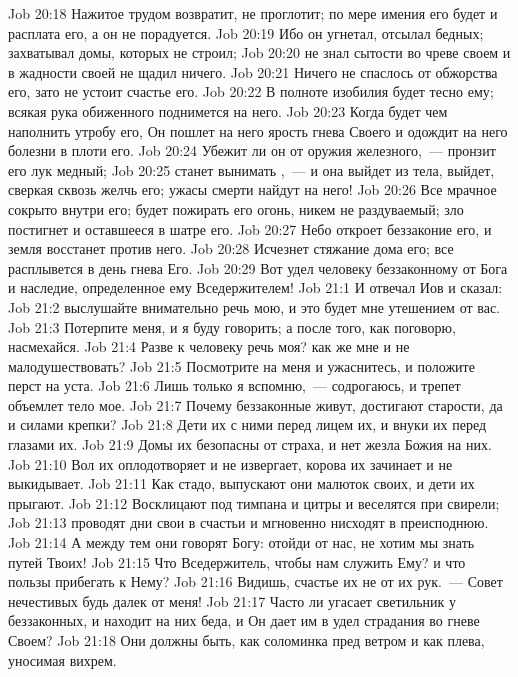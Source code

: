 \vs Job 20:18 Нажитое трудом возвратит, не проглотит; по мере имения его будет и расплата его, а он не порадуется.
\vs Job 20:19 Ибо он угнетал, отсылал бедных; захватывал домы, которых не строил;
\vs Job 20:20 не знал сытости во чреве своем и в жадности своей не щадил ничего.
\vs Job 20:21 Ничего не спаслось от обжорства его, зато не устоит счастье его.
\vs Job 20:22 В полноте изобилия будет тесно ему; всякая рука обиженного поднимется на него.
\vs Job 20:23 Когда будет чем наполнить утробу его, Он пошлет на него ярость гнева Своего и одождит на него болезни в плоти его.
\vs Job 20:24 Убежит ли он от оружия железного,~--- пронзит его лук медный;
\vs Job 20:25 станет вынимать ,~--- и она выйдет из тела, выйдет, сверкая сквозь желчь его; ужасы смерти найдут на него!
\vs Job 20:26 Все мрачное сокрыто внутри его; будет пожирать его огонь, никем не раздуваемый; зло постигнет и оставшееся в шатре его.
\vs Job 20:27 Небо откроет беззаконие его, и земля восстанет против него.
\vs Job 20:28 Исчезнет стяжание дома его; все расплывется в день гнева Его.
\vs Job 20:29 Вот удел человеку беззаконному от Бога и наследие, определенное ему Вседержителем!
\vs Job 21:1 И отвечал Иов и сказал:
\vs Job 21:2 выслушайте внимательно речь мою, и это будет мне утешением от вас.
\vs Job 21:3 Потерпите меня, и я буду говорить; а после того, как поговорю, насмехайся.
\vs Job 21:4 Разве к человеку речь моя? как же мне и не малодушествовать?
\vs Job 21:5 Посмотрите на меня и ужаснитесь, и положите перст на уста.
\vs Job 21:6 Лишь только я вспомню,~--- содрогаюсь, и трепет объемлет тело мое.
\vs Job 21:7 Почему беззаконные живут, достигают старости, да и силами крепки?
\vs Job 21:8 Дети их с ними перед лицем их, и внуки их перед глазами их.
\vs Job 21:9 Домы их безопасны от страха, и нет жезла Божия на них.
\vs Job 21:10 Вол их оплодотворяет и не извергает, корова их зачинает и не выкидывает.
\vs Job 21:11 Как стадо, выпускают они малюток своих, и дети их прыгают.
\vs Job 21:12 Восклицают под  тимпана и цитры и веселятся при  свирели;
\vs Job 21:13 проводят дни свои в счастьи и мгновенно нисходят в преисподнюю.
\vs Job 21:14 А между тем они говорят Богу: отойди от нас, не хотим мы знать путей Твоих!
\vs Job 21:15 Что Вседержитель, чтобы нам служить Ему? и что пользы прибегать к Нему?
\vs Job 21:16 Видишь, счастье их не от их рук.~--- Совет нечестивых будь далек от меня!
\vs Job 21:17 Часто ли угасает светильник у беззаконных, и находит на них беда, и Он дает им в удел страдания во гневе Своем?
\vs Job 21:18 Они должны быть, как соломинка пред ветром и как плева, уносимая вихрем.
